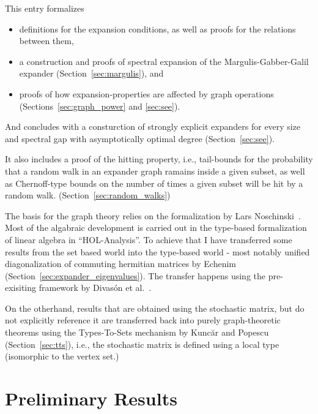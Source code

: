 \documentclass[11pt,a4paper]{article}
\begin{document}
This entry formalizes 
\begin{itemize}
\item definitions for the expansion conditions, as well as proofs for the relations between them,
\item a construction and proofs of spectral expansion of the Margulis-Gabber-Galil expander 
  (Section~\ref{sec:margulis}), and
\item proofs of how expansion-properties are affected by graph operations
(Sections~\ref{sec:graph_power} and \ref{sec:see}).
\end{itemize}
And concludes with a consturction of strongly explicit expanders for every size and 
spectral gap with asymptotically optimal degree (Section~\ref{sec:see}). 

It also includes a proof of the hitting property, i.e., tail-bounds for the probability that a 
random walk in an expander graph ramains inside a given subset, as well as Chernoff-type bounds on 
the number of times a given subset will be hit by a random walk. (Section~\ref{sec:random_walks})

The basis for the graph theory relies on the formalization by 
Lars Noschinski~\cite{Graph_Theory-AFP}. Most of the algabraic development is carried out in the
type-based formalization of linear algebra in ``HOL-Analysis''. To achieve that I have transferred 
some  results from the set based world into the type-based world - most notably unified 
diagonalization of commuting hermitian matrices by Echenim~\cite{Commuting_Hermitian-AFP} 
(Section~\ref{sec:expander_eigenvalues}). The transfer happens using the pre-exisiting framework by 
Divas\'{o}n et al.~\cite{Perron_Frobenius-AFP}.

On the otherhand, results that are obtained using the stochastic matrix, but do not explicitly 
reference it are transferred back into purely graph-theoretic theorems using the Types-To-Sets 
mechanism by Kunc\u{a}r and Popescu~\cite{kuncar2016} (Section~\ref{sec:tts}), i.e., the stochastic
matrix is defined using a local type (isomorphic to the vertex set.)


\section{Preliminary Results}




\end{document}
